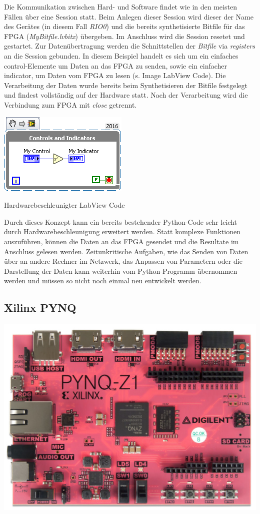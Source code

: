 \documentclass[11pt]{article}
\begin{document}
    Die Kommunikation zwischen Hard- und Software findet wie in den meisten
Fällen über eine Session statt. Beim Anlegen dieser Session wird dieser
der Name des Gerätes (in diesem Fall \emph{RIO0}) und die bereits
synthetisierte Bitfile für das FPGA (\emph{MyBitfile.lvbitx}) übergeben.
Im Anschluss wird die Session resetet und gestartet. Zur
Datenübertragung werden die Schnittstellen der \emph{Bitfile} via
\emph{registers} an die Session gebunden. In diesem Beispiel handelt es
sich um ein einfaches control-Elemente um Daten an das FPGA zu senden,
sowie ein einfacher indicator, um Daten vom FPGA zu lesen (s. Image
LabView Code). Die Verarbeitung der Daten wurde bereits beim
Synthetisieren der Bitfile festgelegt und findest vollständig auf der
Hardware statt. Nach der Verarbeitung wird die Verbindung zum FPGA mit
\emph{close} getrennt.

\includegraphics{images/fpga_labview.png}

Hardwarebeschleunigter LabView Code

Durch dieses Konzept kann ein bereits bestehender Python-Code sehr
leicht durch Hardwarebeschleunigung erweitert werden. Statt komplexe
Funktionen auszuführen, können die Daten an das FPGA gesendet und die
Resultate im Anschluss gelesen werden. Zeitunkritische Aufgaben, wie das
Senden von Daten über an andere Rechner im Netzwerk, das Anpassen von
Parametern oder die Darstellung der Daten kann weiterhin vom
Python-Programm übernommen werden und müssen so nicht noch einmal neu
entwickelt werden.

    \hypertarget{xilinx-pynq}{%
\subsection{Xilinx PYNQ}\label{xilinx-pynq}}

\includegraphics{images/fpga_pynq.jpg}
\end{document}
